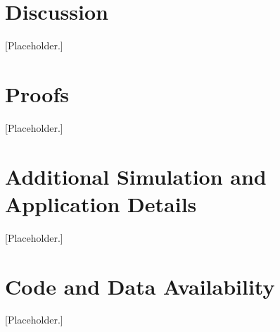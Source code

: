 \documentclass[12pt]{article}
\begin{document}
\section{Discussion}
\label{sec:discussion}
[Placeholder.]




\begin{appendices}

\section{Proofs}
\label{app:proofs}
[Placeholder.]

\section{Additional Simulation and Application Details}
\label{app:extra}
[Placeholder.]

\section{Code and Data Availability}
\label{app:code}
[Placeholder.]

\end{appendices}
\end{document}
